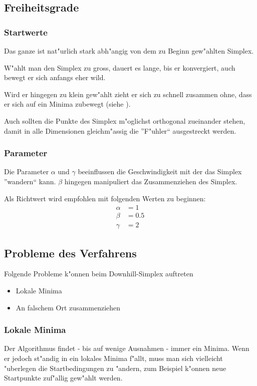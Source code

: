\subsection{Freiheitsgrade}
\subsubsection{Startwerte}
Das ganze ist nat"urlich stark abh"angig von dem zu Beginn gew"ahlten Simplex.

W"ahlt man den Simplex zu gross, dauert es lange, bis er konvergiert, auch bewegt er sich anfangs eher wild.

Wird er hingegen zu klein gew"ahlt zieht er sich zu schnell zusammen ohne, dass er sich auf ein Minima zubewegt (siehe ).

Auch sollten die Punkte des Simplex m"oglichst orthogonal zueinander stehen, damit in alle Dimensionen gleichm"assig die ''F"uhler`` ausgestreckt werden.

\subsubsection{Parameter}
Die Parameter $\alpha$ und $\gamma$ beeinflussen die Geschwindigkeit mit der das Simplex ''wandern`` kann.
$\beta$ hingegen manipuliert das Zusammenziehen des Simplex.

Als Richtwert wird empfohlen mit folgenden Werten zu beginnen:
\begin{align*}
\alpha &= 1 \\
\beta &= 0.5 \\
\gamma &= 2
\end{align*}

\subsection{Probleme des Verfahrens}
Folgende Probleme k"onnen beim Downhill-Simplex auftreten
\begin{itemize}
\item Lokale Minima
\item An falschem Ort zusammenziehen
\end{itemize}

\subsubsection{Lokale Minima}
Der Algorithmus findet - bis auf wenige Ausnahmen - immer ein Minima. Wenn er jedoch st"andig in ein lokales Minima f"allt, muss man sich vielleicht "uberlegen die Startbedingungen zu "andern, 
zum Beispiel k"onnen neue Startpunkte zuf"allig gew"ahlt werden.


